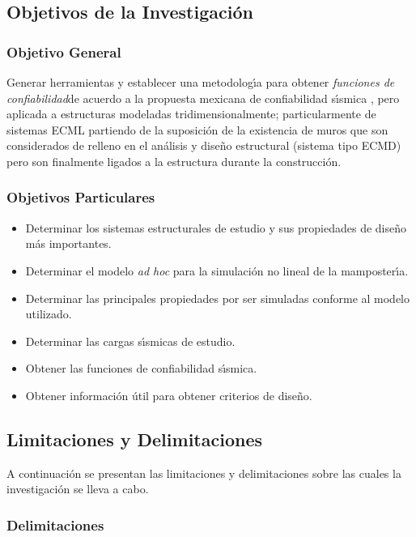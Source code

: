 \subsection{Objetivos de la Investigaci\'on}

\subsubsection{Objetivo General}

Generar herramientas y establecer una metodolog\'{\i}a para obtener \emph{funciones de confiabilidad}de acuerdo a la propuesta mexicana de confiabilidad s\'{\i}smica \cite{DE2006}, pero aplicada a estructuras modeladas tridimensionalmente; particularmente de sistemas ECML partiendo de la suposici\'on de la existencia de muros que son considerados de relleno en el an\'alisis y dise\~no estructural (sistema tipo ECMD) pero son finalmente ligados a la estructura durante la construcci\'on.

\subsubsection{Objetivos Particulares}

\begin{itemize}
\item Determinar los sistemas estructurales de estudio y sus propiedades de dise\~no m\'as importantes.
	\item Determinar el modelo \emph{ad hoc} para la simulaci\'on no lineal de la mamposter\'{\i}a.
	\item Determinar las principales propiedades por ser simuladas conforme al modelo utilizado.
	\item Determinar las cargas s\'{\i}smicas de estudio.
	\item Obtener las funciones de confiabilidad s\'{\i}smica.
	\item Obtener informaci\'on \'util para obtener criterios de dise\~no.
\end{itemize}

	\subsection{Limitaciones y Delimitaciones}

A continuaci\'on se presentan las limitaciones y delimitaciones sobre las cuales la investigaci\'on se lleva a cabo.

	\subsubsection{Delimitaciones}
		
